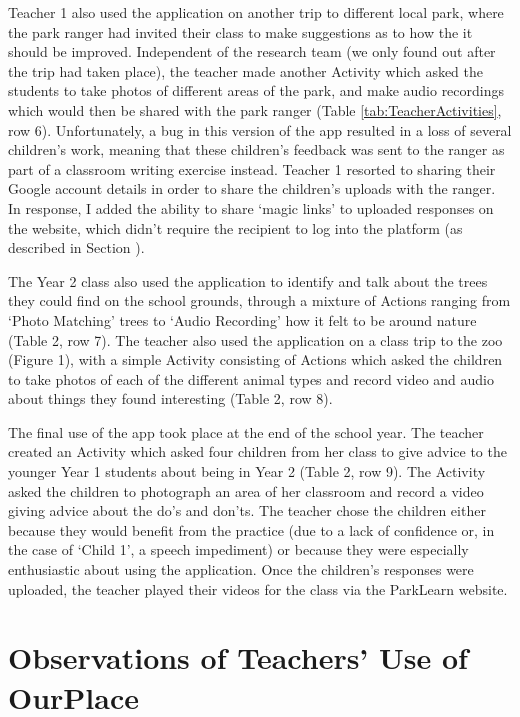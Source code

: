 Teacher 1 also used the application on another trip to different local park, where the park ranger had invited their class to make suggestions as to how the it should be improved. Independent of the research team (we only found out after the trip had taken place), the teacher made another Activity which asked the students to take photos of different areas of the park, and make audio recordings which would then be shared with the park ranger (Table \ref{tab:TeacherActivities}, row 6). Unfortunately, a bug in this version of the app resulted in a loss of several children’s work, meaning that these children’s feedback was sent to the ranger as part of a classroom writing exercise instead. Teacher 1 resorted to sharing their Google account details in order to share the children's uploads with the ranger. In response, I added the ability to share `magic links' to uploaded responses on the website, which didn't require the recipient to log into the platform (as described in Section \label{sec:ImplementationWeb}).

The Year 2 class also used the application to identify and talk about the trees they could find on the school grounds, through a mixture of Actions ranging from ‘Photo Matching’ trees to ‘Audio Recording’ how it felt to be around nature (Table 2, row 7). The teacher also used the application on a class trip to the zoo (Figure 1), with a simple Activity consisting of Actions which asked the children to take photos of each of the different animal types and record video and audio about things they found interesting (Table 2, row 8).

The final use of the app took place at the end of the school year. The teacher created an Activity which asked four children from her class to give advice to the younger Year 1 students about being in Year 2 (Table 2, row 9). The Activity asked the children to photograph an area of her classroom and record a video giving advice about the do’s and don’ts. The teacher chose the children either because they would benefit from the practice (due to a lack of confidence or, in the case of ‘Child 1’, a speech impediment) or because they were especially enthusiastic about using the application. Once the children’s responses were uploaded, the teacher played their videos for the class via the ParkLearn website.

\section{Observations of Teachers' Use of OurPlace}

